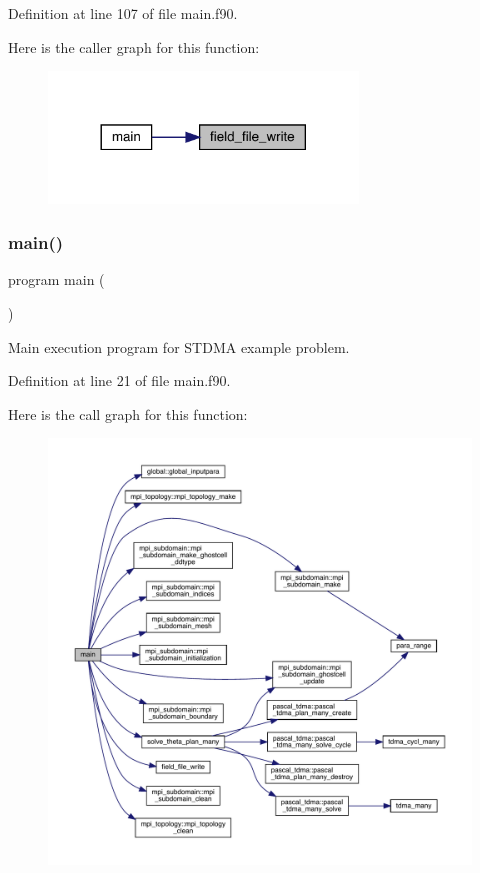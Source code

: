 Definition at line 107 of file main.\+f90.

Here is the caller graph for this function\+:
\nopagebreak
\begin{figure}[H]
\begin{center}
\leavevmode
\includegraphics[width=233pt]{main_8f90_af0a1310807f21ee1a2c0fdf14c58b63b_icgraph}
\end{center}
\end{figure}
\mbox{\label{main_8f90_a8ec2266d83cd6c0b762cbcbc92c0af3d}} 
\subsubsection{\texorpdfstring{main()}{main()}}
{\footnotesize\ttfamily program main (\begin{DoxyParamCaption}{ }\end{DoxyParamCaption})}



Main execution program for S\+T\+D\+MA example problem. 



Definition at line 21 of file main.\+f90.

Here is the call graph for this function\+:
\nopagebreak
\begin{figure}[H]
\begin{center}
\leavevmode
\includegraphics[width=350pt]{main_8f90_a8ec2266d83cd6c0b762cbcbc92c0af3d_cgraph}
\end{center}
\end{figure}
